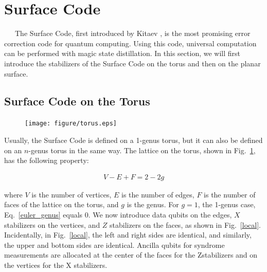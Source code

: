 \documentclass[a4paper,11pt]{ltjsarticle}
\begin{document}
\section{Surface Code}\label{surface_code}{
    \ \ \ The Surface Code, first introduced by Kitaev \cite{kitaev1997}, is the most promising error correction code for quantum computing. Using this code, universal computation can be performed with magic state distillation. In this section, we will first introduce the stabilizers of the Surface Code on the torus and then on the planar surface.

    \subsection{Surface Code on the Torus}{

        \begin{figure}[h]
            \centering
            \texttt{[image: figure/torus.eps]}
            \vspace{0pt}\caption{}
            \label{torus}
            \vspace{-15pt}
        \end{figure}

        Usually, the Surface Code is defined on a 1-genus torus, but it can also be defined on an $n$-genus torus in the same way. The lattice on the torus, shown in Fig.~\ref{torus}, has the following property:

        \begin{align}\label{euler_genus}
            V-E+F=2-2g
        \end{align}
        
        where $V$ is the number of vertices, $E$ is the number of edges, $F$ is the number of faces of the lattice on the torus, and $g$ is the genus. For $g = 1$, the 1-genus case, Eq.~\ref{euler_genus} equals $0$. We now introduce data qubits on the edges, $X$ stabilizers on the vertices, and $Z$ stabilizers on the faces, as shown in Fig.~\ref{local}. Incidentally, in Fig.~\ref{local}, the left and right sides are identical, and similarly, the upper and bottom sides are identical. Ancilla qubits for syndrome measurements are allocated at the center of the faces for the Zstabilizers and on the vertices for the X stabilizers.

}}
\end{document}
